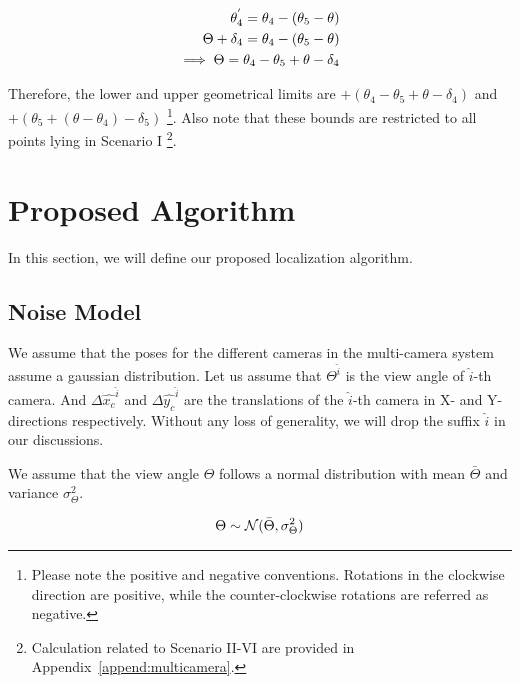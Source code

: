 \begin{equation}
\centering
\begin{aligned}
\theta_4^{'} = \theta_4 - (\theta_5 - \theta)\\
\Theta + \delta_4 = \theta_4 - (\theta_5 - \theta)\\
\implies \Theta = \theta_4 - \theta_5 + \theta - \delta_4
\end{aligned}
\end{equation}

Therefore, the lower and upper geometrical limits are $+(\theta_4 - \theta_5 + \theta - \delta_4)$ and $+(\theta_5 + (\theta - \theta_4) - \delta_5)$ \footnote{Please note the positive and negative conventions. Rotations in the clockwise direction are positive, while the counter-clockwise rotations are referred as negative.}. Also note that these bounds are restricted to all points lying in Scenario I \footnote{Calculation related to Scenario II-VI are provided in Appendix~\ref{append:multicamera}.}.



\section{Proposed Algorithm}  %
\label{sec:prop-alg}

In this section, we will define our proposed localization algorithm.

\subsection{Noise Model}
We assume that the poses for the different cameras in the multi-camera system assume a gaussian distribution. Let us assume that $\Theta^{\hat{i}}$ is the view angle of $\hat{i}$-th camera. And $\Delta \hat{x_c}^{\hat{i}}$ and $\Delta \hat{y_c}^{\hat{i}}$ are the translations of the $\hat{i}$-th camera in X- and Y- directions respectively. Without any loss of generality, we will drop the suffix $\hat{i}$ in our discussions.

We assume that the view angle $\Theta$ follows a normal distribution with mean $\bar{\Theta}$ and variance $\sigma_\Theta^2$.

\begin{equation}
\centering
\begin{aligned}
\Theta \sim \mathcal{N}(\bar{\Theta} , \sigma_\Theta^2)
\end{aligned}
\end{equation}

